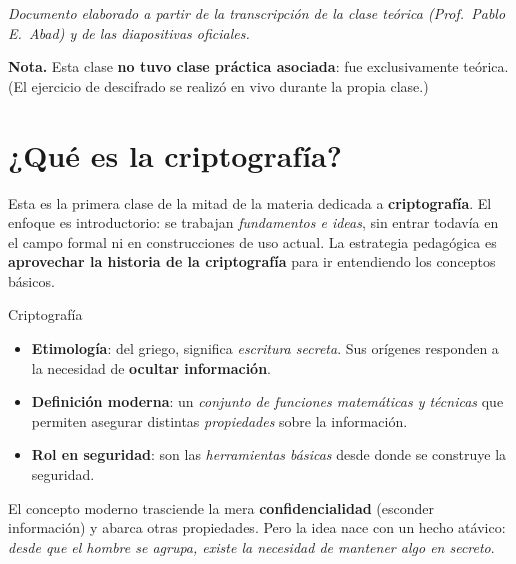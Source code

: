 \documentclass[11pt,a4paper]{article}
\begin{document}
\begin{titlepage}
\vspace{0.5cm}
{\footnotesize\itshape Documento elaborado a partir de la transcripción de la clase teórica
(Prof.\ Pablo E.\ Abad) y de las diapositivas oficiales.}

\vspace{0.4cm}
\begin{tcolorbox}[enhanced,colback=practGreenL,colframe=practGreen,boxrule=1pt,
  arc=3pt,width=0.8\textwidth,halign=center]
\small\textbf{Nota.} Esta clase \textbf{no tuvo clase práctica asociada}: fue exclusivamente
teórica. (El ejercicio de descifrado se realizó en vivo durante la propia clase.)
\end{tcolorbox}
\end{titlepage}

\tableofcontents
\newpage

\section{¿Qué es la criptografía?}

Esta es la primera clase de la mitad de la materia dedicada a \textbf{criptografía}. El
enfoque es introductorio: se trabajan \emph{fundamentos e ideas}, sin entrar todavía en el
campo formal ni en construcciones de uso actual. La estrategia pedagógica es
\textbf{aprovechar la historia de la criptografía} para ir entendiendo los conceptos básicos.

\begin{defbox}{Criptografía}
\begin{itemize}[leftmargin=1.4em,itemsep=2pt]
  \item \textbf{Etimología}: del griego, significa \emph{escritura secreta}. Sus orígenes
        responden a la necesidad de \textbf{ocultar información}.
  \item \textbf{Definición moderna}: un \emph{conjunto de funciones matemáticas y técnicas}
        que permiten asegurar distintas \emph{propiedades} sobre la información.
  \item \textbf{Rol en seguridad}: son las \emph{herramientas básicas} desde donde se
        construye la seguridad.
\end{itemize}
\end{defbox}

El concepto moderno trasciende la mera \textbf{confidencialidad} (esconder información) y
abarca otras propiedades. Pero la idea nace con un hecho atávico: \emph{desde que el hombre
se agrupa, existe la necesidad de mantener algo en secreto}.
\end{document}
